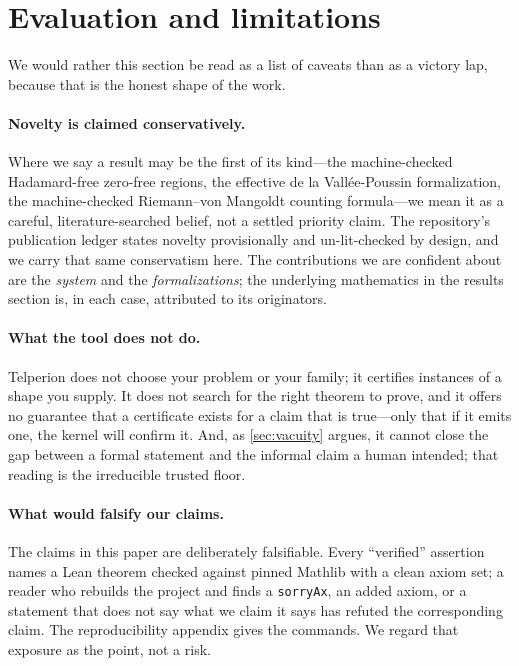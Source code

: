 \section{Evaluation and limitations}
\label{sec:evaluation}

We would rather this section be read as a list of caveats than as a victory lap,
because that is the honest shape of the work.

\paragraph{Novelty is claimed conservatively.} Where we say a result may be the
first of its kind---the machine-checked Hadamard-free zero-free regions, the
effective de la Vallée-Poussin formalization, the machine-checked
Riemann--von Mangoldt counting formula---we mean it as a careful,
literature-searched belief, not a settled priority claim. The repository's
publication ledger states novelty provisionally and un-lit-checked by design, and
we carry that same conservatism here. The contributions we are confident about are
the \emph{system} and the \emph{formalizations}; the underlying mathematics in
the results section is, in each case, attributed to its originators.

\paragraph{What the tool does not do.} Telperion does not choose your problem or
your family; it certifies instances of a shape you supply. It does not search for
the right theorem to prove, and it offers no guarantee that a certificate exists
for a claim that is true---only that if it emits one, the kernel will confirm it.
And, as \cref{sec:vacuity} argues, it cannot close the gap between a formal
statement and the informal claim a human intended; that reading is the irreducible
trusted floor.

\paragraph{What would falsify our claims.} The claims in this paper are
deliberately falsifiable. Every ``verified'' assertion names a Lean theorem
checked against pinned Mathlib with a clean axiom set; a reader who rebuilds the
project and finds a \texttt{sorryAx}, an added axiom, or a statement that does not
say what we claim it says has refuted the corresponding claim. The reproducibility
appendix gives the commands. We regard that exposure as the point, not a risk.
